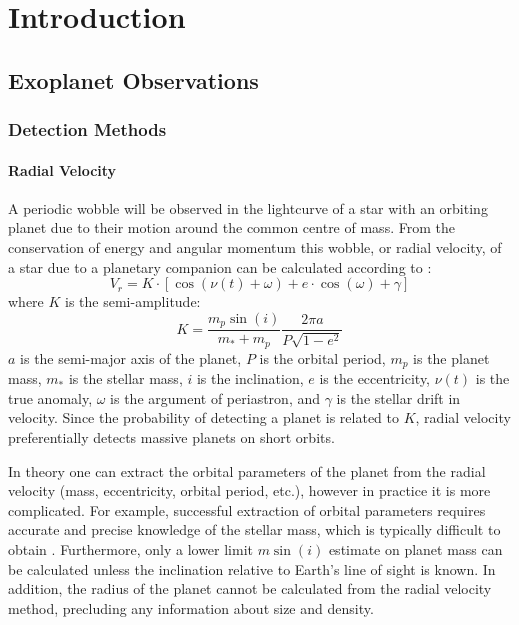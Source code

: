 \chapter{Introduction}
\label{chap:intro}

\section{Exoplanet Observations}
\subsection{Detection Methods}
\subsubsection{Radial Velocity}
\label{sec:RV}
A periodic wobble will be observed in the lightcurve of a star with an orbiting planet due to their motion around the common centre of mass. 
From the conservation of energy and angular momentum this wobble, or radial velocity, of a star due to a planetary companion can be calculated according to \citep{Beauge2007}:
\begin{equation}
V_r = K \cdot [\cos(\nu(t) + \omega) + e\cdot \cos(\omega) + \gamma]
\end{equation}
where $K$ is the semi-amplitude:
\begin{equation}
K = \frac{m_p \sin(i)}{m_* + m_p} \frac{2\pi a}{P\sqrt{1-e^2}}
\label{eq:K}
\end{equation}
$a$ is the semi-major axis of the planet, $P$ is the orbital period, $m_p$ is the planet mass, $m_*$ is the stellar mass, $i$ is the inclination, $e$ is the eccentricity, $\nu(t)$ is the true anomaly, $\omega$ is the argument of periastron, and $\gamma$ is the stellar drift in velocity.
Since the probability of detecting a planet is related to $K$, radial velocity preferentially detects massive planets on short orbits. 

In theory one can extract the orbital parameters of the planet from the radial velocity (mass, eccentricity, orbital period, etc.), however in practice it is more complicated.
For example, successful extraction of orbital parameters requires accurate and precise knowledge of the stellar mass, which is typically difficult to obtain \citep[e.g.][]{Brown2011}.
Furthermore, only a lower limit $m\sin(i)$ estimate on planet mass can be calculated unless the inclination relative to Earth's line of sight is known. 
In addition, the radius of the planet cannot be calculated from the radial velocity method, precluding any information about size and density.


